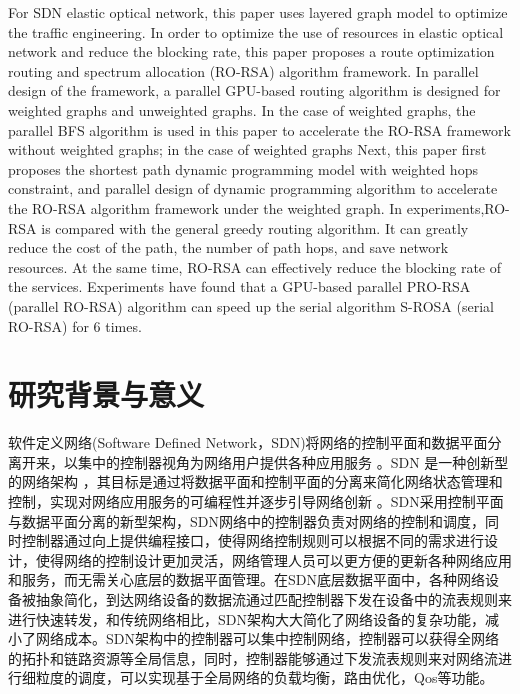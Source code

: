 \documentclass[master]{thesis-uestc}
\begin{document}
\begin{englishabstract}
For SDN elastic optical network, this paper uses layered graph model to optimize the traffic engineering. In order to optimize the use of resources in elastic optical network and reduce the blocking rate, this paper proposes a route optimization routing and spectrum allocation (RO-RSA) algorithm framework. In parallel design of the framework, a parallel GPU-based routing algorithm is designed for weighted graphs and unweighted graphs. In the case of weighted graphs, the parallel BFS algorithm is used in this paper to accelerate the RO-RSA framework without weighted graphs; in the case of weighted graphs Next, this paper first proposes the shortest path dynamic programming model with weighted hops constraint, and parallel design of dynamic programming algorithm to accelerate the RO-RSA algorithm framework under the weighted graph. In experiments,RO-RSA is compared with the general greedy routing algorithm. It can greatly reduce the cost of the path, the number of path hops, and save network resources. At the same time, RO-RSA can effectively reduce the blocking rate of the services. Experiments have found that a GPU-based parallel PRO-RSA (parallel RO-RSA) algorithm can speed up the serial algorithm S-ROSA (serial RO-RSA) for 6 times.


\end{englishabstract}
\thesistableofcontents
\thesisfigurelist
\thesistablelist
\thesischapterexordium
\section{研究背景与意义}
软件定义网络(Software Defined Network，SDN)将网络的控制平面和数据平面分离开来，以集中的控制器视角为网络用户提供各种应用服务  。SDN 是一种创新型的网络架构 ，其目标是通过将数据平面和控制平面的分离来简化网络状态管理和控制，实现对网络应用服务的可编程性并逐步引导网络创新 。SDN采用控制平面与数据平面分离的新型架构，SDN网络中的控制器负责对网络的控制和调度，同时控制器通过向上提供编程接口，使得网络控制规则可以根据不同的需求进行设计，使得网络的控制设计更加灵活，网络管理人员可以更方便的更新各种网络应用和服务，而无需关心底层的数据平面管理。在SDN底层数据平面中，各种网络设备被抽象简化，到达网络设备的数据流通过匹配控制器下发在设备中的流表规则来进行快速转发，和传统网络相比，SDN架构大大简化了网络设备的复杂功能，减小了网络成本。SDN架构中的控制器可以集中控制网络，控制器可以获得全网络的拓扑和链路资源等全局信息，同时，控制器能够通过下发流表规则来对网络流进行细粒度的调度，可以实现基于全局网络的负载均衡，路由优化，Qos等功能。
\end{document}
